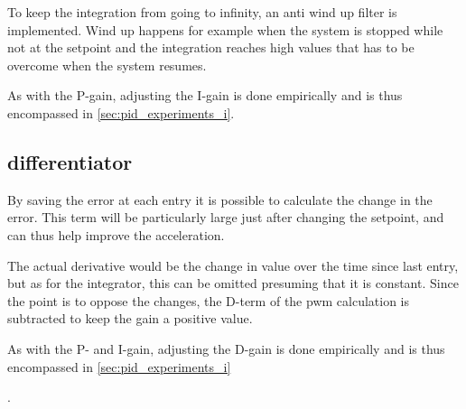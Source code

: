 To keep the integration from going to infinity, an anti wind up filter is implemented. Wind up happens for example when the system is stopped while not at the setpoint and the integration reaches high values that has to be overcome when the system resumes.

As with the P-gain, adjusting the I-gain is done empirically and is thus encompassed in \ref{sec:pid_experiments_i}.

\subsection{differentiator}
By saving the error at each entry it is possible to calculate the change in the error. This term will be particularly large just after changing the setpoint, and can thus help improve the acceleration. 

The actual derivative would be the change in value over the time since last entry, but as for the integrator, this can be omitted presuming that it is constant. Since the point is to oppose the changes, the D-term of the pwm calculation is subtracted to keep the gain a positive value.

As with the P- and I-gain, adjusting the D-gain is done empirically and is thus encompassed in \ref{sec:pid_experiments_i}



.











